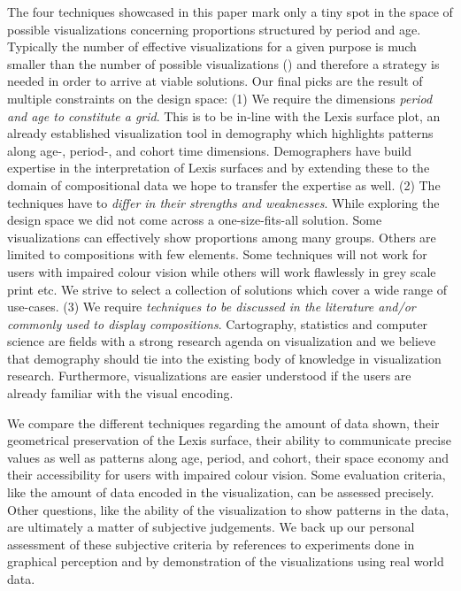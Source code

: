 \documentclass[parskip=half]{scrartcl}
\begin{document}
The four techniques showcased in this paper mark only a tiny spot in the space of possible visualizations concerning proportions structured by period and age. Typically the number of effective visualizations for a given purpose is much smaller than the number of possible visualizations (\cite{Munzner2014}) and therefore a strategy is needed in order to arrive at viable solutions. Our final picks are the result of multiple constraints on the design space:
  (1) We require the dimensions \emph{period and age to constitute a grid}. This is to be in-line with the Lexis surface plot, an already established visualization tool in demography which highlights patterns along age-, period-, and cohort time dimensions. Demographers have build expertise in the interpretation of Lexis surfaces and by extending these to the domain of compositional data we hope to transfer the expertise as well.
  (2) The techniques have to \emph{differ in their strengths and weaknesses}. While exploring the design space we did not come across a one-size-fits-all solution. Some visualizations can effectively show proportions among many groups. Others are limited to compositions with few elements. Some techniques will not work for users with impaired colour vision while others will work flawlessly in grey scale print etc. We strive to select a collection of solutions which cover a wide range of use-cases.
  (3) We require \emph{techniques to be discussed in the literature and/or commonly used to display compositions}. Cartography, statistics and computer science are fields with a strong research agenda on visualization and we believe that demography should tie into the existing body of knowledge in visualization research. Furthermore, visualizations are easier understood if the users are already familiar with the visual encoding.

We compare the different techniques regarding the amount of data shown, their geometrical preservation of the Lexis surface, their ability to communicate precise values as well as patterns along age, period, and cohort, their space economy and their accessibility for users with impaired colour vision. Some evaluation criteria, like the amount of data encoded in the visualization, can be assessed precisely. Other questions, like the ability of the visualization to show patterns in the data, are ultimately a matter of subjective judgements. We back up our personal assessment of these subjective criteria by references to experiments done in graphical perception and by demonstration of the visualizations using real world data.
\end{document}
